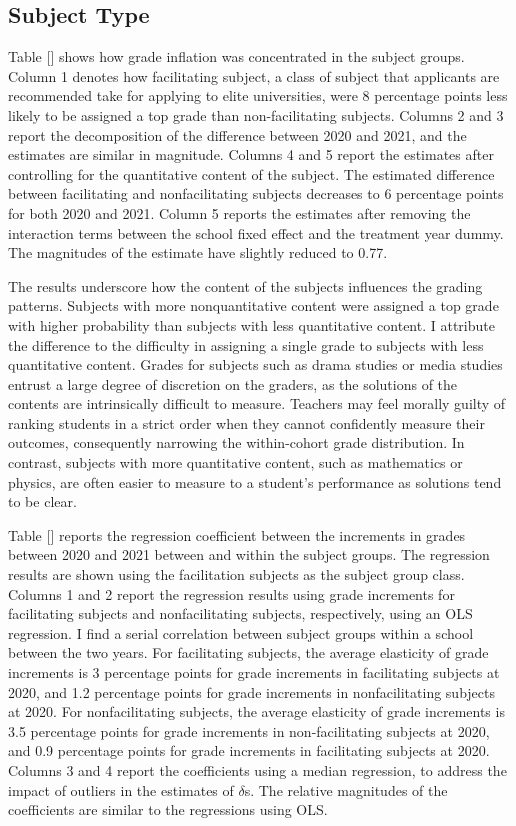 \subsection{Subject Type}
Table [] shows how grade inflation was concentrated in the subject groups. Column 1 denotes how facilitating subject, a class of subject that applicants are recommended take for applying to elite universities, were 8 percentage points less likely to be assigned a top grade than non-facilitating subjects. Columns 2 and 3 report the decomposition of the difference between 2020 and 2021, and the estimates are similar in magnitude. Columns 4 and 5 report the estimates after controlling for the quantitative content of the subject. The estimated difference between facilitating and nonfacilitating subjects decreases to 6 percentage points for both 2020 and 2021. Column 5 reports the estimates after removing the interaction terms between the school fixed effect and the treatment year dummy. The magnitudes of the estimate have slightly reduced to 0.77.

The results underscore how the content of the subjects influences the grading patterns. Subjects with more nonquantitative content were assigned a top grade with higher probability than subjects with less quantitative content. I attribute the difference to the difficulty in assigning a single grade to subjects with less quantitative content. Grades for subjects such as drama studies or media studies entrust a large degree of discretion on the graders, as the solutions of the contents are intrinsically difficult to measure. Teachers may feel morally guilty of ranking students in a strict order when they cannot confidently measure their outcomes, consequently narrowing the within-cohort grade distribution. In contrast, subjects with more quantitative content, such as mathematics or physics, are often easier to measure to a student's performance as solutions tend to be clear.

Table [] reports the regression coefficient between the increments in grades between 2020 and 2021 between and within the subject groups. The regression results are shown using the facilitation subjects as the subject group class. Columns 1 and 2 report the regression results using grade increments for facilitating subjects and nonfacilitating subjects, respectively, using an OLS regression. I find a serial correlation between subject groups within a school between the two years. For facilitating subjects, the average elasticity of grade increments is 3 percentage points for grade increments in facilitating subjects at 2020, and 1.2 percentage points for grade increments in nonfacilitating subjects at 2020. For nonfacilitating subjects, the average elasticity of grade increments is 3.5 percentage points for grade increments in non-facilitating subjects at 2020, and 0.9 percentage points for grade increments in facilitating subjects at 2020. Columns 3 and 4 report the coefficients using a median regression, to address the impact of outliers in the estimates of $\delta$s. The relative magnitudes of the coefficients are similar to the regressions using OLS. 

